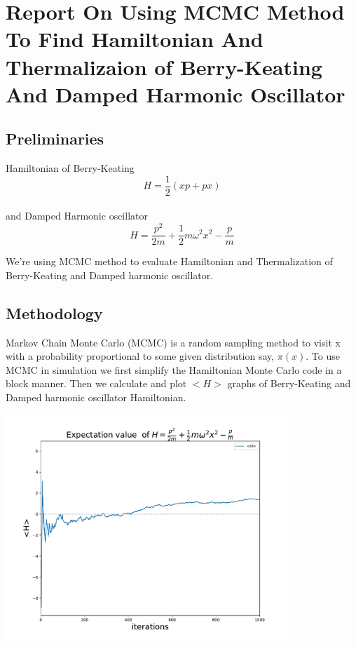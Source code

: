 \documentclass[12pt, letterpaper]{article}
\title{}
\begin{document}
    \section*{Report On Using MCMC Method To Find Hamiltonian And Thermalizaion of Berry-Keating And Damped Harmonic Oscillator}
    \subsection*{Preliminaries}
        Hamiltonian of Berry-Keating  
        \begin{equation}
            H = \frac{1}{2}(xp + px)
        \end{equation}
        \\
        
        and Damped Harmonic oscillator 
        \begin{equation}
            H = \frac{p^2}{2m} + \frac{1}{2}m \omega ^{2} x^{2} - \frac{p}{m} 
        \end{equation}

        We're using MCMC method to evaluate Hamiltonian and Thermalization of Berry-Keating and Damped harmonic oscillator. 
    
    \subsection*{Methodology}
        Markov Chain Monte Carlo (MCMC) is a random sampling method to visit x with a probability proportional to some given
        distribution say, $\pi (x)$. To use MCMC in simulation we first simplify the Hamiltonian Monte Carlo code in a block
        manner. Then we calculate and plot $<H>$ graphs of Berry-Keating and Damped harmonic oscillator Hamiltonian.
        
        \begin{adjustbox}{center,caption={Graph of Expectation value of Damped Harmonic Oscillator},nofloat=figure,label={somelabel}}
            \includegraphics[width=0.8\textwidth]{dho.pdf}
        \end{adjustbox}
\end{document}
